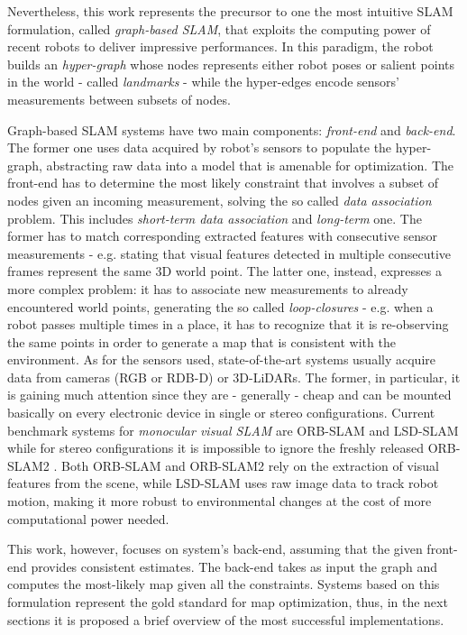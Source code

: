 Nevertheless, this work represents the precursor to one the most intuitive SLAM formulation, called \textit{graph-based SLAM}, that exploits the computing power of recent robots to deliver impressive performances. In this paradigm, the robot builds an \textit{hyper-graph} whose nodes represents either robot poses or salient points in the world - called \textit{landmarks} - while the hyper-edges encode sensors' measurements between subsets of nodes. 

Graph-based SLAM systems have two main components: \textit{front-end} and \textit{back-end}. The former one uses data acquired by robot's sensors to populate the hyper-graph, abstracting raw data into a model that is amenable for optimization. The front-end has to determine the most likely constraint that involves a subset of nodes given an incoming measurement, solving the so called \textit{data association} problem. This includes \textit{short-term data association} and \textit{long-term} one. The former has to match corresponding extracted features with consecutive sensor measurements - e.g. stating that visual features detected in multiple consecutive frames represent the same 3D world point. The latter one, instead, expresses a more complex problem: it has to associate new measurements to already encountered world points, generating the so called \textit{loop-closures} - e.g. when a robot passes multiple times in a place, it has to recognize that it is re-observing the same points in order to generate a map that is consistent with the environment. As for the sensors used, state-of-the-art systems usually acquire data from cameras (RGB or RDB-D) or 3D-LiDARs. The former, in particular, it is gaining much attention since they are - generally - cheap and can be mounted basically on every electronic device in single or stereo configurations. Current benchmark systems for \textit{monocular visual SLAM} are ORB-SLAM \cite{mur2015orb-slam} and LSD-SLAM \cite{engel2014lsd-slam} while for stereo configurations it is impossible to ignore the freshly released ORB-SLAM2 \cite{mur2017orb-slam2}. Both ORB-SLAM and ORB-SLAM2 rely on the extraction of visual features from the scene, while LSD-SLAM uses raw image data to track robot motion, making it more robust to environmental changes at the cost of more computational power needed. 

This work, however, focuses on system's back-end, assuming that the given front-end provides consistent estimates. The back-end takes as input the graph and computes the most-likely map given all the constraints. Systems based on this formulation represent the gold standard for map optimization, thus, in the next sections it is proposed a brief overview of the most successful implementations.

